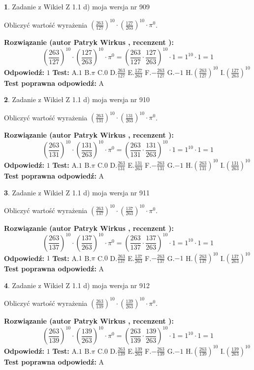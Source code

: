 \documentclass[12pt, a4paper]{article}
\theoremstyle{definition} %
\newtheorem{zad}{}
\newcommand{\zadStart}[1]{\begin{zad}#1\newline}
\newcommand{\zadStop}{\end{zad}}
\newcommand{\rozwStart}[2]{\noindent \textbf{Rozwiązanie (autor #1 , recenzent #2): }\newline}
\newcommand{\rozwStop}{\newline}
\newcommand{\odpStart}{\noindent \textbf{Odpowiedź:}\newline}
\newcommand{\odpStop}{\newline}
\newcommand{\testStart}{\noindent \textbf{Test:}\newline}
\newcommand{\testStop}{\newline}
\newcommand{\kluczStart}{\noindent \textbf{Test poprawna odpowiedź:}\newline}
\newcommand{\kluczStop}{\newline}
\begin{document}
\zadStart{Zadanie z Wikieł Z 1.1 d) moja wersja nr 909}

Obliczyć wartość wyrażenia $(\frac{263}{127})^{10} \cdot (\frac{127}{263})^{10} \cdot \pi^{0}$.
\zadStop
\rozwStart{Patryk Wirkus}{}
$$(\frac{263}{127})^{10} \cdot (\frac{127}{263})^{10} \cdot \pi^{0} = (\frac{263}{127} \cdot \frac{127}{263})^{10} \cdot 1 = 1^{10} \cdot 1 = 1$$
\rozwStop
\odpStart
$1$
\odpStop
\testStart
A.$1$ B.$\pi$ C.$0$ D.$\frac{263}{127}$ E.$\frac{127}{263}$
F.$-\frac{263}{127}$ G.$-1$
H.$(\frac{263}{127})^{10}$
I.$(\frac{127}{263})^{10}$
\testStop
\kluczStart
A
\kluczStop



\zadStart{Zadanie z Wikieł Z 1.1 d) moja wersja nr 910}

Obliczyć wartość wyrażenia $(\frac{263}{131})^{10} \cdot (\frac{131}{263})^{10} \cdot \pi^{0}$.
\zadStop
\rozwStart{Patryk Wirkus}{}
$$(\frac{263}{131})^{10} \cdot (\frac{131}{263})^{10} \cdot \pi^{0} = (\frac{263}{131} \cdot \frac{131}{263})^{10} \cdot 1 = 1^{10} \cdot 1 = 1$$
\rozwStop
\odpStart
$1$
\odpStop
\testStart
A.$1$ B.$\pi$ C.$0$ D.$\frac{263}{131}$ E.$\frac{131}{263}$
F.$-\frac{263}{131}$ G.$-1$
H.$(\frac{263}{131})^{10}$
I.$(\frac{131}{263})^{10}$
\testStop
\kluczStart
A
\kluczStop



\zadStart{Zadanie z Wikieł Z 1.1 d) moja wersja nr 911}

Obliczyć wartość wyrażenia $(\frac{263}{137})^{10} \cdot (\frac{137}{263})^{10} \cdot \pi^{0}$.
\zadStop
\rozwStart{Patryk Wirkus}{}
$$(\frac{263}{137})^{10} \cdot (\frac{137}{263})^{10} \cdot \pi^{0} = (\frac{263}{137} \cdot \frac{137}{263})^{10} \cdot 1 = 1^{10} \cdot 1 = 1$$
\rozwStop
\odpStart
$1$
\odpStop
\testStart
A.$1$ B.$\pi$ C.$0$ D.$\frac{263}{137}$ E.$\frac{137}{263}$
F.$-\frac{263}{137}$ G.$-1$
H.$(\frac{263}{137})^{10}$
I.$(\frac{137}{263})^{10}$
\testStop
\kluczStart
A
\kluczStop



\zadStart{Zadanie z Wikieł Z 1.1 d) moja wersja nr 912}

Obliczyć wartość wyrażenia $(\frac{263}{139})^{10} \cdot (\frac{139}{263})^{10} \cdot \pi^{0}$.
\zadStop
\rozwStart{Patryk Wirkus}{}
$$(\frac{263}{139})^{10} \cdot (\frac{139}{263})^{10} \cdot \pi^{0} = (\frac{263}{139} \cdot \frac{139}{263})^{10} \cdot 1 = 1^{10} \cdot 1 = 1$$
\rozwStop
\odpStart
$1$
\odpStop
\testStart
A.$1$ B.$\pi$ C.$0$ D.$\frac{263}{139}$ E.$\frac{139}{263}$
F.$-\frac{263}{139}$ G.$-1$
H.$(\frac{263}{139})^{10}$
I.$(\frac{139}{263})^{10}$
\testStop
\kluczStart
A
\kluczStop
\end{document}
